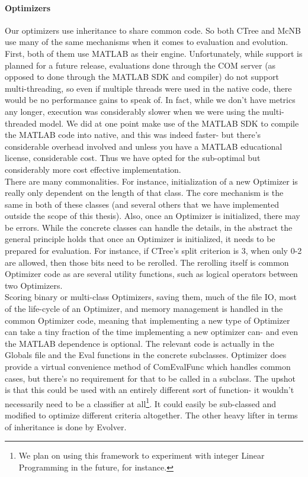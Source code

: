 \paragraph{Optimizers}
Our optimizers use inheritance to share common code.  So both CTree and McNB use many of the same mechanisms when it comes to evaluation and evolution.  First, both of them use MATLAB as their engine.  Unfortunately, while support is planned for a future release, evaluations done through the COM server (as opposed to done through the MATLAB SDK and compiler) do not support multi-threading, so even if multiple threads were used in the native code, there would be no performance gains to speak of.  In fact, while we don't have metrics any longer, execution was considerably slower when we were using the multi-threaded model.  We did at one point make use of the MATLAB SDK to compile the MATLAB code into native, and this was indeed faster- but there's considerable overhead involved and unless you have a MATLAB educational license, considerable cost.  Thus we have opted for the sub-optimal but considerably more cost effective implementation.\\
There are many commonalities.  For instance, initialization of a new Optimizer is really only dependent on the length of that class.  The core mechanism is the same in both of these classes (and several others that we have implemented outside the scope of this thesis).  Also, once an Optimizer is initialized, there may be errors.  While the concrete classes can handle the details, in the abstract the general principle holds that once an Optimizer is initialized, it needs to be prepared for evaluation.  For instance, if CTree's split criterion is 3, when only 0-2 are allowed, then those bits need to be rerolled.  The rerolling itself is common Optimizer code as are several utility functions, such as logical operators between two Optimizers.  \\
Scoring binary or multi-class Optimizers, saving them, much of the file IO, most of the life-cycle of an Optimizer, and memory management is handled in the common Optimizer code, meaning that implementing a new type of Optimizer can take a tiny fraction of the time implementing a new optimizer can- and even the MATLAB dependence is optional.  The relevant code is actually in the Globals file and the Eval functions in the concrete subclasses.  Optimizer does provide a virtual convenience method of ComEvalFunc which handles common cases, but there's no requirement for that to be called in a subclass.  The upshot is that this could be used with an entirely different sort of function- it wouldn't necessarily need to be a classifier at all\footnote{We plan on using this framework to experiment with integer Linear Programming in the future, for instance.}.  It could easily be sub-classed and modified to optimize different criteria altogether.  The other heavy lifter in terms of inheritance is done by Evolver.

